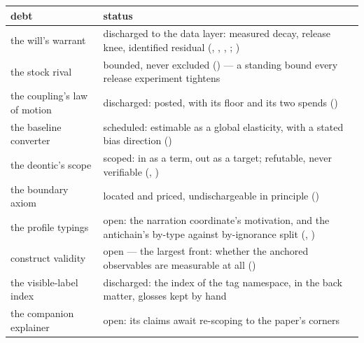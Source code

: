 \documentclass[../main]{subfiles}
\begin{document}
\begin{table}[htbp]
  \centering
  \begin{tabularx}{\textwidth}{@{} >{\hsize}L >{\hsize}L @{}}
    \toprule
    \textbf{debt} & \textbf{status} \\
    \midrule
    the will's warrant & discharged to the data layer: measured decay, release
      knee, identified residual (, ,
      , ; ) \\
    \addlinespace
    the stock rival & bounded, never excluded () --- a standing
      bound every release experiment tightens \\
    \addlinespace
    the coupling's law of motion & discharged: posted, with its floor and its two
      spends () \\
    \addlinespace
    the baseline converter & scheduled: estimable as a global elasticity, with a
      stated bias direction () \\
    \addlinespace
    the deontic's scope & scoped: in as a term, out as a target; refutable, never
      verifiable (, ) \\
    \addlinespace
    the boundary axiom & located and priced, undischargeable in principle
      () \\
    \addlinespace
    the profile typings & open: the narration coordinate's motivation, and the
      antichain's by-type against by-ignorance split (,
      ) \\
    \addlinespace
    construct validity & open --- the largest front: whether the anchored
      observables are measurable at all () \\
    \addlinespace
    the visible-label index & discharged: the index of the tag namespace, in the back
      matter, glosses kept by hand \\
    \addlinespace
    the companion explainer & open: its claims await re-scoping to the paper's
      corners \\
    \bottomrule
  \end{tabularx}
\end{table}
\end{document}
